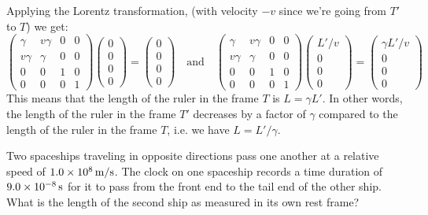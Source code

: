 \documentclass{../../templates/lkx_pset}
\begin{document}
\begin{solution}
	Applying the Lorentz transformation, (with velocity $-v$ since we're going from $T'$ to $T$) we get:
	\[
		\begin{pmatrix}
			\gamma  & v\gamma & 0 & 0 \\
			v\gamma & \gamma  & 0 & 0 \\
			0       & 0       & 1 & 0 \\
			0       & 0       & 0 & 1
		\end{pmatrix}\begin{pmatrix}0\\0\\0\\0\end{pmatrix}
		= \begin{pmatrix}0\\0\\0\\0\end{pmatrix}\quad\textrm{and}\quad
		\begin{pmatrix}
			\gamma  & v\gamma & 0 & 0 \\
			v\gamma & \gamma  & 0 & 0 \\
			0       & 0       & 1 & 0 \\
			0       & 0       & 0 & 1
		\end{pmatrix}\begin{pmatrix}L'/v\\0\\0\\0\end{pmatrix}
		= \begin{pmatrix}\gamma L' / v\\0\\0\\0\end{pmatrix}
	\]
	This means that the length of the ruler in the frame $T$ is $L = \gamma L'$. In other words, the length of the ruler in the frame $T'$ decreases by a factor of $\gamma$ compared to the length of the ruler in the frame $T$, i.e. we have $L = L'/\gamma$.
\end{solution}

\begin{problem}{3}
Two spaceships traveling in opposite directions pass one another at a relative speed of $\mpssi{1.0e8}$. The clock on one spaceship records a time duration of $\ssi{9.0e-8}$ for it to pass from the front end to the tail end of the other ship. What is the length of the second ship as measured in its own rest frame?
\end{problem}
\end{document}
